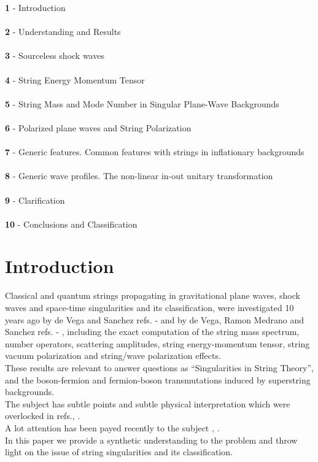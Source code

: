 \documentclass[12pt,a4paper]{article}
\begin{document}
{\bf 1} - Introduction \\ \\
{\bf 2} - Understanding and Results \\ \\
{\bf 3} - Sourceless shock waves \\ \\
{\bf 4} - String Energy Momentum Tensor \\ \\
{\bf 5} - String Mass and Mode Number in Singular Plane-Wave Backgrounds \\ \\
{\bf 6} - Polarized plane waves and String Polarization \\ \\
{\bf 7} - Generic features. Common features with strings in inflationary 
backgrounds \\ \\
{\bf 8} - Generic wave profiles. The non-linear in-out unitary transformation   \\ \\
{\bf 9} - Clarification \\ \\
{\bf 10} - Conclusions and Classification 
  
\section{Introduction}
Classical and quantum strings propagating in gravitational plane waves, shock 
waves and space-time singularities and its classification, were investigated 
10 years ago by de Vega and Sanchez refs.\cite{vs1} - \cite{vs6} and by de Vega, Ramon Medrano and 
Sanchez refs.\cite{vms1} - \cite{vms3}, including the exact computation of the string mass spectrum, 
number operators, scattering amplitudes, string energy-momentum tensor,  
string vacuum polarization and string/wave polarization effects.\\ These 
results are relevant 
to answer questions as ``Singularities in String Theory'', and the 
boson-fermion and fermion-boson transmutations induced by superstring 
backgrounds.\\ The 
subject has subtle points and subtle physical interpretation which were 
overlocked in refs.\cite{hs1}, \cite{hs2}.\\ A lot attention has been payed recently to the subject \cite{prt1}, \cite{mt1}.\\
In this paper we provide a synthetic understanding to the problem and throw 
light on the issue of string singularities and its classification. 
\end{document}
